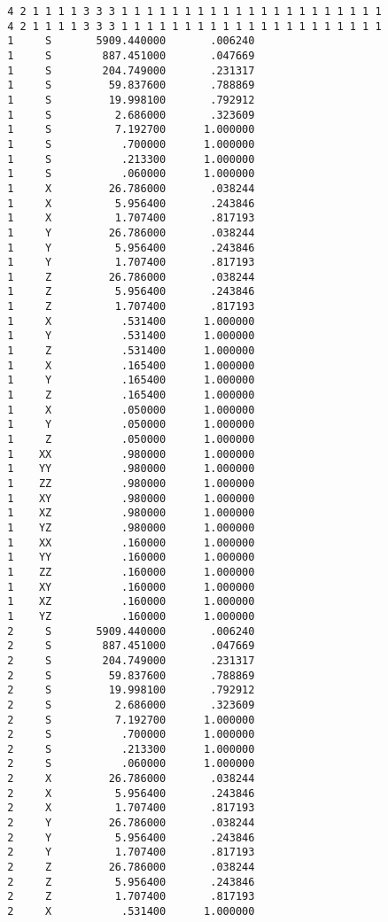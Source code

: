 \documentclass[aps,pra,groupedaddress,
                amsfonts,amssymb,
                preprint
    ]{revtex4}
\begin{document}
\begin{verbatim}
 4 2 1 1 1 1 3 3 3 1 1 1 1 1 1 1 1 1 1 1 1 1 1 1 1 1 1 1 1 1
 4 2 1 1 1 1 3 3 3 1 1 1 1 1 1 1 1 1 1 1 1 1 1 1 1 1 1 1 1 1
 1     S       5909.440000       .006240
 1     S        887.451000       .047669
 1     S        204.749000       .231317
 1     S         59.837600       .788869
 1     S         19.998100       .792912
 1     S          2.686000       .323609
 1     S          7.192700      1.000000
 1     S           .700000      1.000000
 1     S           .213300      1.000000
 1     S           .060000      1.000000
 1     X         26.786000       .038244
 1     X          5.956400       .243846
 1     X          1.707400       .817193
 1     Y         26.786000       .038244
 1     Y          5.956400       .243846
 1     Y          1.707400       .817193
 1     Z         26.786000       .038244
 1     Z          5.956400       .243846
 1     Z          1.707400       .817193
 1     X           .531400      1.000000
 1     Y           .531400      1.000000
 1     Z           .531400      1.000000
 1     X           .165400      1.000000
 1     Y           .165400      1.000000
 1     Z           .165400      1.000000
 1     X           .050000      1.000000
 1     Y           .050000      1.000000
 1     Z           .050000      1.000000
 1    XX           .980000      1.000000
 1    YY           .980000      1.000000
 1    ZZ           .980000      1.000000
 1    XY           .980000      1.000000
 1    XZ           .980000      1.000000
 1    YZ           .980000      1.000000
 1    XX           .160000      1.000000
 1    YY           .160000      1.000000
 1    ZZ           .160000      1.000000
 1    XY           .160000      1.000000
 1    XZ           .160000      1.000000
 1    YZ           .160000      1.000000
 2     S       5909.440000       .006240
 2     S        887.451000       .047669
 2     S        204.749000       .231317
 2     S         59.837600       .788869
 2     S         19.998100       .792912
 2     S          2.686000       .323609
 2     S          7.192700      1.000000
 2     S           .700000      1.000000
 2     S           .213300      1.000000
 2     S           .060000      1.000000
 2     X         26.786000       .038244
 2     X          5.956400       .243846
 2     X          1.707400       .817193
 2     Y         26.786000       .038244
 2     Y          5.956400       .243846
 2     Y          1.707400       .817193
 2     Z         26.786000       .038244
 2     Z          5.956400       .243846
 2     Z          1.707400       .817193
 2     X           .531400      1.000000

\end{verbatim}
\end{document}
